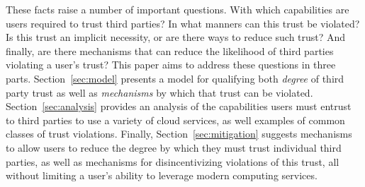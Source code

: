 These facts raise a number of important questions. With which
capabilities are users required to trust third parties? In what
manners can this trust be violated? Is this trust an implicit
necessity, or are there ways to reduce such trust? And finally, are
there mechanisms that can reduce the likelihood of third parties
violating a user's trust? This paper aims to address these questions
in three parts. Section~\ref{sec:model} presents a model for
qualifying both \emph{degree} of third party trust as well as
\emph{mechanisms} by which that trust can be violated.
Section~\ref{sec:analysis} provides an analysis of the capabilities
users must entrust to third parties to use a variety of cloud
services, as well examples of common classes of trust
violations. Finally, Section~\ref{sec:mitigation} suggests mechanisms
to allow users to reduce the degree by which they must trust
individual third parties, as well as mechanisms for disincentivizing
violations of this trust, all without limiting a user's ability to
leverage modern computing services.
